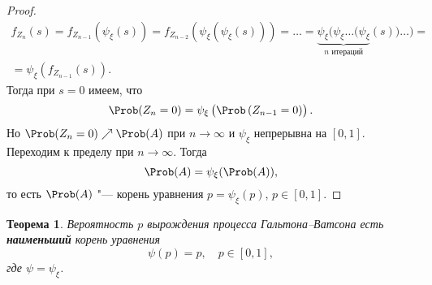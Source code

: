 \documentclass[a4paper]{article}
\theoremstyle{plain}
\newtheorem{thm}{Теорема}[section]
\theoremstyle{definition}
\theoremstyle{remark}
\begin{document}
\begin{proof}
\begin{multline*}
    f_{Z_{n}}(s) = f_{Z_{n-1}}(\psi_{\xi}(s)) = f_{Z_{n-2}} \left(\psi_{\xi} \left( \psi_{\xi} \left(s \right) \right) \right) = \ldots = \underbrace{\psi_{\xi} (\psi_{\xi} \ldots (\psi_{\xi}}_{\text{$n$ итераций}}(s)) \ldots ) = \\ = \psi_{\xi} (f_{Z_{n-1}} (s)){.}
  \end{multline*}
  Тогда при $s = 0$ имеем, что
  \begin{equation*}
    \Prob (Z_{n} = 0) = \psi_{\xi} \left( \Prob\left(Z_{n-1}=0 \right) \right) {.}
  \end{equation*}
  Но $\Prob(Z_{n} = 0) \nearrow \Prob(A)$ при $n \to \infty$ и $\psi_{\xi}$ непрерывна на $[0, 1]$.
  Переходим к пределу при $n \to \infty$. Тогда
  \begin{equation*}
    \Prob(A) = \psi_{\xi} (\Prob(A)){,}
  \end{equation*}
  то есть $\Prob(A)$ "--- корень уравнения $p = \psi_{\xi}(p)$, $p \in [0, 1]$.
\end{proof}

\begin{thm}
  Вероятность $p$ вырождения процесса Гальтона--Ватсона есть \textbf{наименьший} корень уравнения
  \begin{equation}
    \label{eq1}
    \psi(p) = p, \quad p \in [0, 1]{,}
  \end{equation}
  где $\psi = \psi_{\xi}$.
\end{thm}
\end{document}
